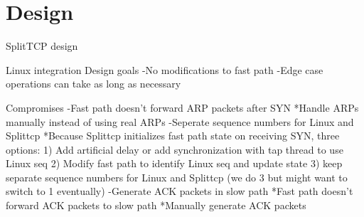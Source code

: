 \section{Design}

SplitTCP design

Linux integration Design goals
 -No modifications to fast path
 -Edge case operations can take as long as necessary

Compromises
 -Fast path doesn't forward ARP packets after SYN
	*Handle ARPs manually instead of using real ARPs
 -Seperate sequence numbers for Linux and Splittcp
    *Because Splittcp initializes fast path state on receiving SYN, three options:
		1) Add artificial delay or add synchronization with tap thread to use Linux seq
		2) Modify fast path to identify Linux seq and update state
		3) keep separate sequence numbers for Linux and Splittcp
		(we do 3 but might want to switch to 1 eventually)
 -Generate ACK packets in slow path
	*Fast path doesn't forward ACK packets to slow path
	*Manually generate ACK packets

